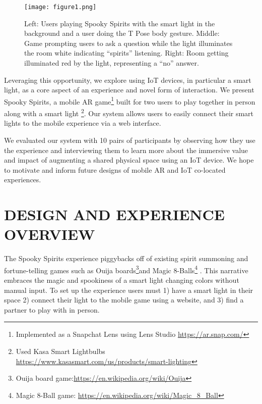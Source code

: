 \documentclass[sigconf, language=french,
language=german, language=spanish, language=english]{acmart}
\begin{document}
\begin{figure}[h!] \texttt{[image: figure1.png]}
  \caption{Left: Users playing Spooky Spirits with the smart
light in the background and a user doing the T Pose body
gesture. Middle: Game prompting users to ask a question
while the light illuminates the room white indicating “spirits”
listening. Right: Room getting illuminated red by the light,
representing a “no” answer.
}
  \label{fig1}
\end{figure}

Leveraging this opportunity, we explore using IoT devices, in
particular a smart light, as a core aspect of an experience and novel form of interaction. We present Spooky Spirits, a mobile AR game\footnote{Implemented as a Snapchat Lens using Lens Studio \url{https://ar.snap.com/}} built for two users to play together in person along with a smart
light \footnote{Used Kasa Smart Lightbulbs \url{https://www.kasasmart.com/us/products/smart-lighting}}. Our system allows users to easily connect their smart lights
to the mobile experience via a web interface.

We evaluated our system with 10 pairs of participants by observing how they use the experience and interviewing them to
learn more about the immersive value and impact of augmenting a
shared physical space using an IoT device. We hope to motivate and
inform future designs of mobile AR and IoT co-located experiences.

\section{DESIGN AND EXPERIENCE OVERVIEW}
The Spooky Spirits experience piggybacks off of existing spirit
summoning and fortune-telling games such as Ouija boards\footnote{Ouija board game:\url{https://en.wikipedia.org/wiki/Ouija}}and
Magic 8-Balls\footnote{Magic 8-Ball game: \url{https://en.wikipedia.org/wiki/Magic_8_Ball}}
. This narrative embraces the magic and spookiness
of a smart light changing colors without manual input. To set up
the experience users must 1) have a smart light in their space 2)
connect their light to the mobile game using a website, and 3) find
a partner to play with in person.
\end{document}
